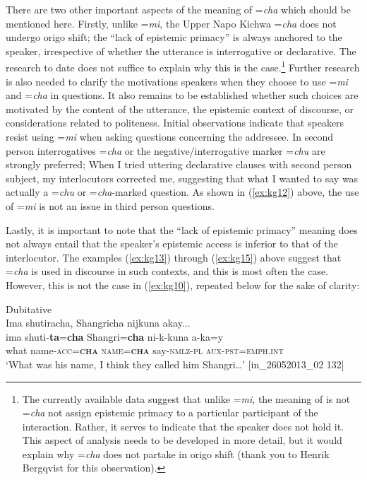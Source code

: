 \documentclass[output=paper]{langscibook}
\begin{document}
There are two other important aspects of the meaning of =\textit{cha} which should be mentioned here. Firstly, unlike =\textit{mi}, the Upper Napo Kichwa =\textit{cha} does not undergo origo shift; the “lack of epistemic primacy” is always anchored to the speaker, irrespective of whether the utterance is interrogative or declarative. The research to date does not suffice to explain why this is the case.\footnote{The currently available data suggest that unlike =\textit{mi}, the meaning of is not =\textit{cha} not assign epistemic primacy to a particular participant of the interaction. Rather, it serves to indicate that the speaker does not hold it. This aspect of analysis needs to be developed in more detail, but it would explain why =\textit{cha} does not partake in origo shift (thank you to Henrik Bergqvist for this observation).} Further research is also needed to clarify the motivations speakers when they choose to use =\textit{mi} and =\textit{cha} in questions. It also remains to be established whether such choices are motivated by the content of the utterance, the epistemic context of discourse, or considerations related to politeness. Initial observations indicate that speakers resist using =\textit{mi} when asking questions concerning the addressee. In second person interrogatives =\textit{cha} or the negative/interrogative marker =\textit{chu} are strongly preferred; When I tried uttering declarative clauses with second person subject, my interlocutors corrected me, suggesting that what I wanted to say was actually a =\textit{chu} or =\textit{cha}-marked question. As shown in (\ref{ex:kg12}) above, the use of =\textit{mi} is not an issue in third person questions.

Lastly, it is important to note that the “lack of epistemic primacy” meaning does not always entail that the speaker’s epistemic access is inferior to that of the interlocutor. The examples (\ref{ex:kg13}) through (\ref{ex:kg15}) above suggest that =\textit{cha} is used in discourse in such contexts, and this is most often the case. However, this is not the case in (\ref{ex:kg10}), repeated below for the sake of clarity:

\begin{exe}
	 Dubitative\\
	\glll Ima shutiracha, Shangricha nijkuna akay...\\
	ima shuti-\textbf{ta}=\textbf{cha} Shangri=\textbf{cha} ni-k-kuna a-ka=y\\
	what name-\textsc{acc}=\textbf{\textsc{cha}} \textsc{name}=\textbf{\textsc{cha}} say-\textsc{nmlz}-\textsc{pl} \textsc{aux}-\textsc{pst}=\textsc{emph}.\textsc{int}\\
	\trans ‘What was his name, I think they called him Shangri…’ [in\_26052013\_02 132]
\end{exe}
\end{document}
